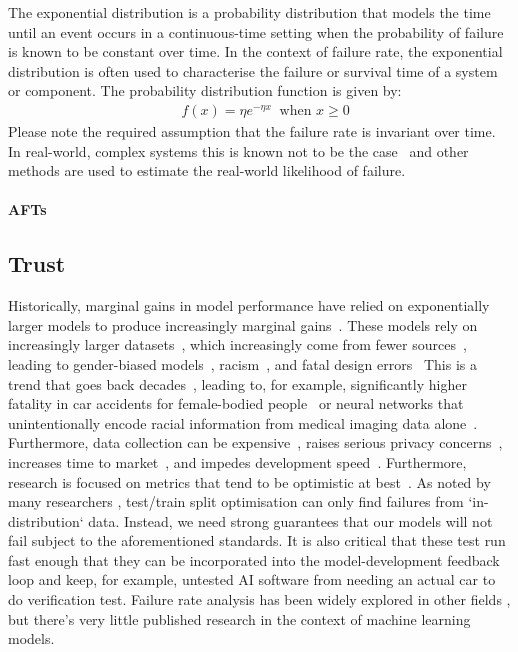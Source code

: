 The exponential distribution is a probability distribution that models the time until an event occurs in a continuous-time setting when the probability of failure is known to be constant over time. 
In the context of failure rate, the exponential distribution is often used to characterise the failure or survival time of a system or component. The probability distribution function is given by:
\begin{align*}
& f(x) = \eta e^{-\eta x}~\textrm{~when~}x\geq 0
\end{align*}
Please note the required assumption that the failure rate is invariant over time. In real-world, complex systems this is known not to be the case~\cite{} and other methods are used to estimate the real-world likelihood of failure. 
\paragraph{AFTs}
\lipsum[1]

\subsection{Trust}
Historically, marginal gains in model performance have relied on exponentially larger models to produce increasingly marginal gains~\cite{desislavov2021compute}.  These models rely on increasingly larger datasets~\cite{desislavov2021compute, vapnik1994measuring, blumer1989learnability}, which increasingly come from fewer sources~\cite{koch2021reduced}, leading to gender-biased models~\cite{lu2020gender}, racism~\cite{buolamwini2018gender}, and fatal design errors~\cite{banks2018driver} This is a trend that goes back decades~\cite{corsaro1982something, ramirez2000resource, buolamwini2018gender}, leading to, for example, significantly higher fatality in car accidents for female-bodied people~\cite{evans2001gender} or neural networks that unintentionally encode racial information from medical imaging data alone~\cite{gichoya2022ai}. Furthermore, data collection can be expensive~\cite{roh2019survey}, raises serious privacy concerns~\cite{bloom2017self}, increases time to market~\cite{lam2004new}, and impedes development speed~\cite{zirger1996effect}. Furthermore, research is focused on metrics that tend to be optimistic at best~\cite{madry2017towards}. As noted by many researchers \cite{madry2017towards, carlini_towards_2017, croce_reliable_2020, meyers}, test/train split optimisation can only find failures from `in-distribution` data. Instead, we need strong guarantees that our models will not fail subject to the aforementioned standards. It is also critical that these test run fast enough that they can be incorporated into the model-development feedback loop and keep, for example, untested AI software from needing an actual car to do verification test. Failure rate analysis has been widely explored in other fields \cite{aft_models}, but there's very little published research in the context of machine learning models.












